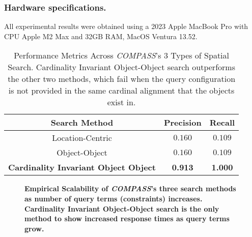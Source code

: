 \subsubsection{Hardware specifications.} 
All experimental results were obtained using a 2023 Apple MacBook Pro with CPU Apple M2 Max and 32GB RAM, MacOS Ventura 13.52.


\small{
\begin{table}[h]
    \begin{center}
        \begin{tabular}{ |c|c|c| } 
            \hline
            Search Method & Precision & Recall\\
            \hline
            Location-Centric & $0.160$ & $0.109$ \\ 
            Object-Object & $0.160$ & $0.109$ \\  
            \textbf{Cardinality Invariant Object Object} & \textbf{0.913} & \textbf{1.000} \\ 
            \hline     
        \end{tabular}
        \caption{Performance Metrics Across \emph{COMPASS}'s 3 Types of Spatial Search. Cardinality Invariant Object-Object search outperforms the other two methods, which fail when the query configuration is not provided in the same cardinal alignment that the objects exist in.} 
        \label{Table:PerformanceResults}
    \end{center}
\end{table}
}

\begin{figure}[h]
    \centering
        
    \caption{\textbf{Empirical Scalability of \emph{COMPASS}'s three search methods as number of query terms (constraints) increases. Cardinality Invariant Object-Object search is the only method to show increased response times as query terms grow.}}\label{figure:query-time} 
\end{figure}

